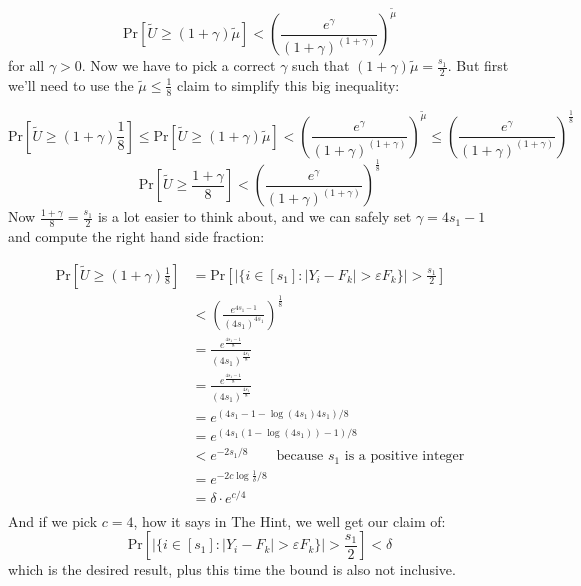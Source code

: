 \documentclass{article}
\let\epsilon\varepsilon
\begin{document}
  \[ \mathrm{Pr}\left[\tilde{U} \geq (1+\gamma)\tilde{\mu}\right] < \left(\frac{e^\gamma}{(1+\gamma)^{(1+\gamma)}}\right)^{\tilde{\mu}} \]
  for all $\gamma > 0$.
  Now we have to pick a correct $\gamma$ such that $(1+\gamma)\tilde{\mu} = \frac{s_1}{2}$.
  But first we'll need to use the $\tilde{\mu} \leq \frac{1}{8}$ claim to simplify this big inequality:

  \[ \mathrm{Pr}\left[\tilde{U} \geq (1+\gamma)\frac{1}{8}\right]
  \leq \mathrm{Pr}\left[\tilde{U} \geq (1+\gamma)\tilde{\mu}\right]
  < \left(\frac{e^\gamma}{(1+\gamma)^{(1+\gamma)}}\right)^{\tilde{\mu}}
  \leq \left(\frac{e^\gamma}{(1+\gamma)^{(1+\gamma)}}\right)^{\frac{1}{8}} \]
  \[ \mathrm{Pr}\left[\tilde{U} \geq \frac{1+\gamma}{8}\right] < \left(\frac{e^\gamma}{(1+\gamma)^{(1+\gamma)}}\right)^{\frac{1}{8}} \]
  Now $\frac{1+\gamma}{8} = \frac{s_1}{2}$ is a lot easier to think about,
  and we can safely set $\gamma = 4s_1-1$ and compute the right hand side fraction:

  \begin{align*}
    \mathrm{Pr}\left[\tilde{U} \geq (1+\gamma)\frac{1}{8}\right]
    &= \mathrm{Pr}\left[|\{i\in[s_1]:|Y_i-F_k| >\epsilon F_k\}| > \frac{s_1}{2}\right] \\
    &< \left(\frac{e^{4s_1-1}}{(4s_1)^{4s_1}}\right)^{\frac{1}{8}}\\
    &= \frac{e^{\frac{4s_1-1}{8}}}{(4s_1)^{\frac{4s_1}{8}}}\\
    &= \frac{e^{\frac{4s_1-1}{8}}}{(4s_1)^{\frac{4s_1}{8}}}\\
    &= e^{(4s_1 - 1 - \log (4s_1) 4s_1)/8}\\
    &= e^{(4s_1 (1 - \log (4s_1)) - 1 )/8}\\
    &< e^{-2s_1/8} \qquad\textrm{because }s_1\textrm{ is a positive integer} \\
    &= e^{-2c\log\frac{1}{\delta}/8}\\
    &= \delta \cdot e^{c/4}\\
  \end{align*}
  And if we pick $c=4$, how it says in The Hint, we well get our claim of:
  \[ \mathrm{Pr}\left[|\{i\in[s_1]:|Y_i-F_k| >\epsilon F_k\}| > \frac{s_1}{2}\right] < \delta \]
  which is the desired result, plus this time the bound is also not inclusive.
\end{document}
